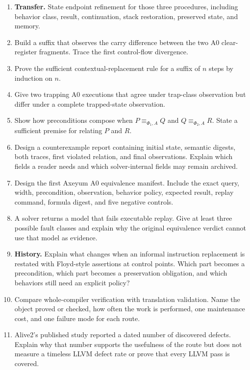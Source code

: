 \begin{enumerate}
\item \textbf{Transfer.} State endpoint refinement for those three procedures,
including behavior class, result, continuation, stack restoration, preserved
state, and memory.

\item Build a suffix that observes the carry difference between the two A0
clear-register fragments. Trace the first control-flow divergence.

\item Prove the sufficient contextual-replacement rule for a suffix of \(n\)
steps by induction on \(n\).

\item Give two trapping A0 executions that agree under trap-class observation
but differ under a complete trapped-state observation.

\item Show how preconditions compose when \(P\equiv_{\Phi_1,A}Q\) and
\(Q\equiv_{\Phi_2,A}R\). State a sufficient premise for relating \(P\) and
\(R\).

\item Design a counterexample report containing initial state, semantic
digests, both traces, first violated relation, and final observations. Explain
which fields a reader needs and which solver-internal fields may remain
archived.

\item Design the first Axeyum A0 equivalence manifest. Include the exact query,
width, precondition, observation, behavior policy, expected result, replay
command, formula digest, and five negative controls.

\item A solver returns a model that fails executable replay. Give at least
three possible fault classes and explain why the original equivalence verdict
cannot use that model as evidence.
\item \textbf{History.} Explain what changes when an informal instruction
replacement is restated with Floyd-style assertions at control points. Which
part becomes a precondition, which part becomes a preservation obligation, and
which behaviors still need an explicit policy?

\item Compare whole-compiler verification with translation validation. Name
the object proved or checked, how often the work is performed, one maintenance
cost, and one failure mode for each route.

\item Alive2's published study reported a dated number of discovered defects.
Explain why that number supports the usefulness of the route but does not
measure a timeless LLVM defect rate or prove that every LLVM pass is covered.


\end{enumerate}
